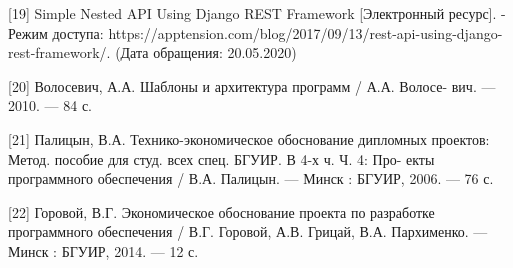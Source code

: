 [19] Simple Nested API Using Django REST Framework [Электронный ресурс]. - Режим доступа: https://apptension.com/blog/2017/09/13/rest-api-using-django-rest-framework/. (Дата обращения: 20.05.2020)

[20] Волосевич, А.А. Шаблоны и архитектура программ / А.А. Волосе- вич. — 2010. — 84 с.

[21] Палицын, В.А. Технико-экономическое обоснование дипломных проектов: Метод. пособие для студ. всех спец. БГУИР. В 4-х ч. Ч. 4: Про- екты программного обеспечения / В.А. Палицын. — Минск : БГУИР, 2006. — 76 с.

[22] Горовой, В.Г. Экономическое обоснование проекта по разработке программного обеспечения / В.Г. Горовой, А.В. Грицай, В.А. Пархименко. — Минск : БГУИР, 2014. — 12 с.
